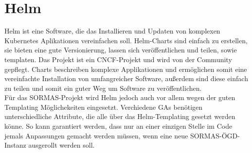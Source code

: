\section{Helm}
Helm ist eine Software, die das Installieren und Updaten von komplexen Kubernetes Aplikationen vereinfachen soll.
Helm-Charts sind einfach zu erstellen, sie bieten eine gute Versionierung, lassen sich veröffentlichen und teilen, sowie templaten.
Das Projekt ist ein \ac{CNCF}-Projekt und wird von der Community gepflegt.
Charts beschreiben komplexe Applikationen und ermöglichen somit eine vereinfachte Installation von umfangreicher Software, außerdem sind diese einfach zu teilen und somit ein guter Weg um Software zu veröffentlichen.
\cite{helm}
\\
Für das \ac{SORMAS}-Projekt wird Helm jedoch auch vor allem wegen der guten Templating Möglichekeiten eingesetzt.
Verchiedene \ac{GAs} benötigen unterschiedliche Attribute, die alle über das Helm-Templating gesetzt werden könne.
So kann garantiert werden, dass nur an einer einzigen Stelle im Code jemals Anpassungen gemacht werden müssen, wenn eine neue \ac{SORMAS-ÖGD}-Instanz ausgerollt werden soll.